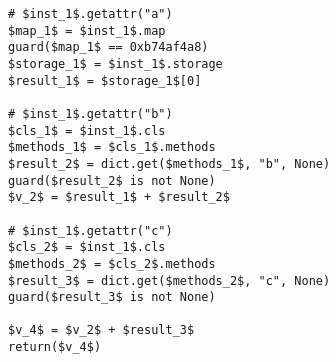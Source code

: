 \begin{Verbatim}
# $inst_1$.getattr("a")
$map_1$ = $inst_1$.map
guard($map_1$ == 0xb74af4a8)
$storage_1$ = $inst_1$.storage
$result_1$ = $storage_1$[0]

# $inst_1$.getattr("b")
$cls_1$ = $inst_1$.cls
$methods_1$ = $cls_1$.methods
$result_2$ = dict.get($methods_1$, "b", None)
guard($result_2$ is not None)
$v_2$ = $result_1$ + $result_2$

# $inst_1$.getattr("c")
$cls_2$ = $inst_1$.cls
$methods_2$ = $cls_2$.methods
$result_3$ = dict.get($methods_2$, "c", None)
guard($result_3$ is not None)

$v_4$ = $v_2$ + $result_3$
return($v_4$)
\end{Verbatim}
